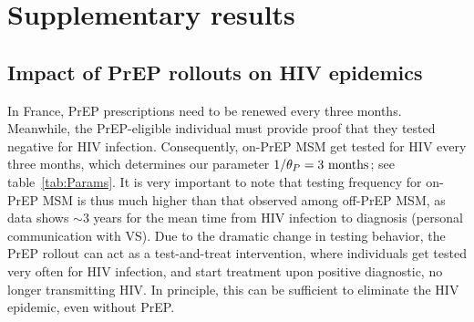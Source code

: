 \documentclass[12pt]{article}
\begin{document}
\section{Supplementary results}

\subsection{Impact of PrEP rollouts on HIV epidemics}

In France, PrEP prescriptions need to be renewed every three months.\cite{CNSANRS2018} Meanwhile, the PrEP-eligible individual must provide proof that they tested negative for HIV infection. Consequently, on-PrEP MSM get tested for HIV every three months, which determines our parameter $1/\theta_P=3~{\rm months}$; see table~\ref{tab:Params}. It is very important to note that {testing frequency for on-PrEP MSM is thus much higher than that observed among off-PrEP MSM, as data shows $\sim3$ years for the mean time from HIV infection to diagnosis (personal communication with VS)}. Due to the dramatic change in testing behavior, the PrEP rollout can act as a test-and-treat intervention, where individuals get tested very often for HIV infection, and start treatment upon positive diagnostic, no longer transmitting HIV. In principle, this can be sufficient to eliminate the HIV epidemic, even without PrEP. \cite{Kretzschmar2013,WHO2016} 
\end{document}
